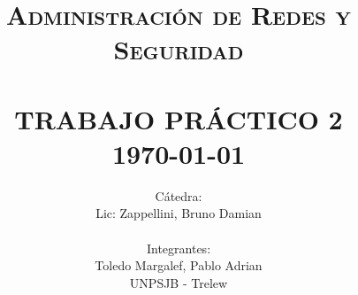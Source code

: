 \title{ \normalsize \textsc{Administración de Redes y Seguridad}
        \\ [2.0cm]
        \HRule{0.5pt} \\
        \LARGE \textbf{\uppercase{Trabajo Práctico 2}}
        \HRule{2pt} \\ [0.5cm]
        \normalsize \today \vspace*{5\baselineskip}}

\date{}

\author{
        Cátedra: \\
        Lic: Zappellini, Bruno Damian \\
\\
        Integrantes: \\
        Toledo Margalef, Pablo Adrian \\
        UNPSJB - Trelew}

\maketitle
